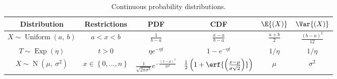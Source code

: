 \documentclass{article}
\begin{document}
\begin{table}[H]
    \centering
    \begin{tabular}{c c c c c c}
        \toprule
        \textbf{Distribution}                                       & \textbf{Restrictions}                  & \textbf{PDF}                                                                         & \textbf{CDF}                                                                            & \(\E{\left( X \right)}\) & \(\Var{\left( X \right)}\)            \\
        \midrule
        \(X \sim \operatorname{Uniform}{\left( a,\: b \right)}\)    & \(a < x < b\)                          & \(\frac{1}{b - a}\)                                                                  & \(\frac{x - a}{b - a}\)                                                                 & \(\frac{a + b}{2}\)      & \(\frac{\left( b - a \right)^2}{12}\) \\
        \(T \sim \operatorname{Exp}{\left( \eta \right)}\)          & \(t > 0\)                              & \(\eta e^{-\eta t}\)                                                                 & \(1 - e^{-\eta t}\)                                                                     & \(1/\eta\)               & \(1/\eta\)                            \\
        \(X \sim \operatorname{N}{\left( \mu,\: \sigma^2 \right)}\) & \(x \in \left\{ 0, \dots, n \right\}\) & \(\frac{1}{\sqrt{2 \pi \sigma^2}} e^{-\frac{\left( x - \mu \right)^2}{2 \sigma^2}}\) & \(\frac{1}{2} \left( 1 + \erf{\left( \frac{x - \mu}{\sigma \sqrt{2}} \right)} \right)\) & \(\mu\)                  & \(\sigma^2\)                          \\
        \bottomrule
    \end{tabular}
    \caption{Continuous probability distributions.} %
\end{table}
\end{document}
